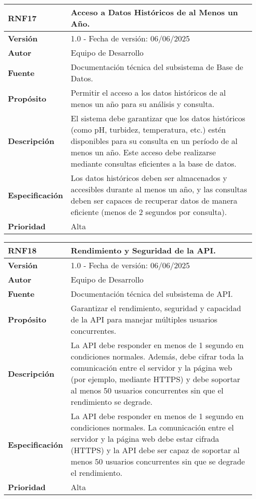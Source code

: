 \begin{longtable}{|l|p{12cm}|}
\hline
\textbf{RNF17} & \textbf{Acceso a Datos Históricos de al Menos un Año.} \\
\hline
\endfirsthead
\hline
\textbf{Versión} & 1.0 - Fecha de versión: 06/06/2025 \\
\hline
\textbf{Autor} & Equipo de Desarrollo \\
\hline
\textbf{Fuente} & Documentación técnica del subsistema de Base de Datos. \\
\hline
\textbf{Propósito} & Permitir el acceso a los datos históricos de al menos un año para su análisis y consulta. \\
\hline
\textbf{Descripción} & El sistema debe garantizar que los datos históricos (como pH, turbidez, temperatura, etc.) estén disponibles para su consulta en un período de al menos un año. Este acceso debe realizarse mediante consultas eficientes a la base de datos. \\
\hline
\textbf{Especificación} & Los datos históricos deben ser almacenados y accesibles durante al menos un año, y las consultas deben ser capaces de recuperar datos de manera eficiente (menos de 2 segundos por consulta). \\
\hline
\textbf{Prioridad} & Alta \\
\hline
\end{longtable}

\begin{longtable}{|l|p{12cm}|}
\hline
\textbf{RNF18} & \textbf{Rendimiento y Seguridad de la API.} \\
\hline
\endfirsthead
\hline
\textbf{Versión} & 1.0 - Fecha de versión: 06/06/2025 \\
\hline
\textbf{Autor} & Equipo de Desarrollo \\
\hline
\textbf{Fuente} & Documentación técnica del subsistema de API. \\
\hline
\textbf{Propósito} & Garantizar el rendimiento, seguridad y capacidad de la API para manejar múltiples usuarios concurrentes. \\
\hline
\textbf{Descripción} & La API debe responder en menos de 1 segundo en condiciones normales. Además, debe cifrar toda la comunicación entre el servidor y la página web (por ejemplo, mediante HTTPS) y debe soportar al menos 50 usuarios concurrentes sin que el rendimiento se degrade. \\
\hline
\textbf{Especificación} & La API debe responder en menos de 1 segundo en condiciones normales. La comunicación entre el servidor y la página web debe estar cifrada (HTTPS) y la API debe ser capaz de soportar al menos 50 usuarios concurrentes sin que se degrade el rendimiento. \\
\hline
\textbf{Prioridad} & Alta \\
\hline
\end{longtable}

